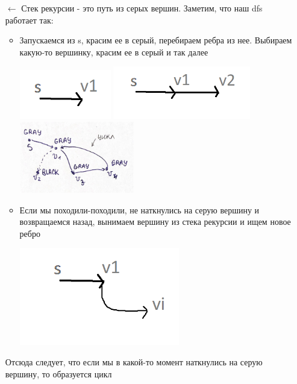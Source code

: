\begin{itemize}
    \item[$\leftarrow$] Стек рекурсии - это путь из серых вершин. Заметим, что наш dfs работает так:
     \begin{itemize}
         \item Запускаемся из s, красим ее в серый, перебираем ребра из нее. Выбираем какую-то вершинку, красим ее в серый и так далее 
        \begin{center}
             \includegraphics[width=4cm]{images/25-28_alg10.PNG}
             \includegraphics[width=6cm]{images/25-28_alg11.PNG}
             \includegraphics[width=5cm]{images/25-28_photo_2021-06-19_01-33-12.jpg}
        \end{center}
        \item Если мы походили-походили, не наткнулись на серую вершину и возвращаемся назад, вынимаем вершину из стека рекурсии и ищем новое ребро
        \begin{center}
             \includegraphics[width=7cm]{images/25-28_alg12.PNG}
        \end{center}
     \end{itemize}
     Отсюда следует, что если мы в какой-то момент наткнулись на серую вершину, то образуется цикл
\end{itemize}
